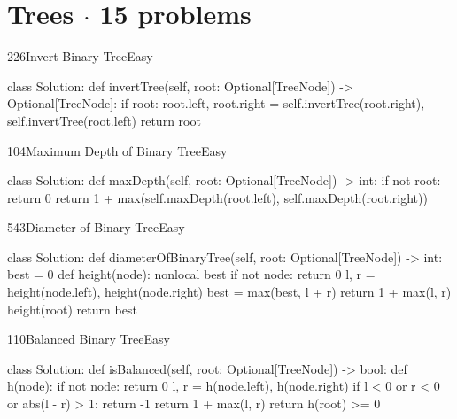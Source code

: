 \section{Trees \texorpdfstring{{\normalsize\color{muted}$\cdot$ 15 problems}}{- 15 problems}}

\begin{problem}{226}{Invert Binary Tree}{Easy}
\begin{code}
class Solution:
    def invertTree(self, root: Optional[TreeNode]) -> Optional[TreeNode]:
        if root:
            root.left, root.right = self.invertTree(root.right), self.invertTree(root.left)
        return root
\end{code}
\end{problem}

\begin{problem}{104}{Maximum Depth of Binary Tree}{Easy}
\begin{code}
class Solution:
    def maxDepth(self, root: Optional[TreeNode]) -> int:
        if not root:
            return 0
        return 1 + max(self.maxDepth(root.left), self.maxDepth(root.right))
\end{code}
\end{problem}

\begin{problem}{543}{Diameter of Binary Tree}{Easy}
\begin{code}
class Solution:
    def diameterOfBinaryTree(self, root: Optional[TreeNode]) -> int:
        best = 0
        def height(node):
            nonlocal best
            if not node:
                return 0
            l, r = height(node.left), height(node.right)
            best = max(best, l + r)
            return 1 + max(l, r)
        height(root)
        return best
\end{code}
\end{problem}

\begin{problem}{110}{Balanced Binary Tree}{Easy}
\begin{code}
class Solution:
    def isBalanced(self, root: Optional[TreeNode]) -> bool:
        def h(node):
            if not node:
                return 0
            l, r = h(node.left), h(node.right)
            if l < 0 or r < 0 or abs(l - r) > 1:
                return -1
            return 1 + max(l, r)
        return h(root) >= 0
\end{code}
\end{problem}

